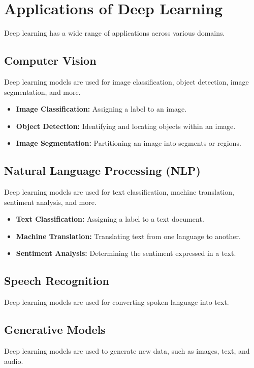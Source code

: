 \section{Applications of Deep Learning}
Deep learning has a wide range of applications across various domains.

\subsection{Computer Vision}
Deep learning models are used for image classification, object detection, image segmentation, and more.

\begin{itemize}
    \item \textbf{Image Classification:} Assigning a label to an image.
    \item \textbf{Object Detection:} Identifying and locating objects within an image.
    \item \textbf{Image Segmentation:} Partitioning an image into segments or regions.
\end{itemize}

\subsection{Natural Language Processing (NLP)}
Deep learning models are used for text classification, machine translation, sentiment analysis, and more.

\begin{itemize}
    \item \textbf{Text Classification:} Assigning a label to a text document.
    \item \textbf{Machine Translation:} Translating text from one language to another.
    \item \textbf{Sentiment Analysis:} Determining the sentiment expressed in a text.
\end{itemize}

\subsection{Speech Recognition}
Deep learning models are used for converting spoken language into text.

\subsection{Generative Models}
Deep learning models are used to generate new data, such as images, text, and audio.

